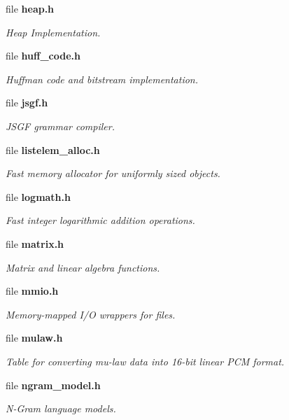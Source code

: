 \begin{DoxyCompactItemize}
file {\bf heap.\-h}
\begin{DoxyCompactList}\small\item\em Heap Implementation. \end{DoxyCompactList}\item 
file {\bf huff\-\_\-code.\-h}
\begin{DoxyCompactList}\small\item\em Huffman code and bitstream implementation. \end{DoxyCompactList}\item 
file {\bf jsgf.\-h}
\begin{DoxyCompactList}\small\item\em J\-S\-G\-F grammar compiler. \end{DoxyCompactList}\item 
file {\bf listelem\-\_\-alloc.\-h}
\begin{DoxyCompactList}\small\item\em Fast memory allocator for uniformly sized objects. \end{DoxyCompactList}\item 
file {\bf logmath.\-h}
\begin{DoxyCompactList}\small\item\em Fast integer logarithmic addition operations. \end{DoxyCompactList}\item 
file {\bf matrix.\-h}
\begin{DoxyCompactList}\small\item\em Matrix and linear algebra functions. \end{DoxyCompactList}\item 
file {\bf mmio.\-h}
\begin{DoxyCompactList}\small\item\em Memory-\/mapped I/\-O wrappers for files. \end{DoxyCompactList}\item 
file {\bf mulaw.\-h}
\begin{DoxyCompactList}\small\item\em Table for converting mu-\/law data into 16-\/bit linear P\-C\-M format. \end{DoxyCompactList}\item 
file {\bf ngram\-\_\-model.\-h}
\begin{DoxyCompactList}\small\item\em N-\/\-Gram language models. \end{DoxyCompactList}\item 

\end{DoxyCompactItemize}
